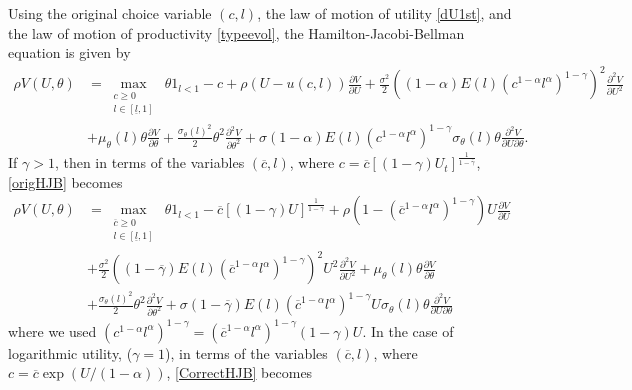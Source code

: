 \documentclass[11pt]{article}
\theoremstyle{plain}
\begin{document}
Using the original choice variable $(c,l)$, the law of motion of utility \eqref{dU1st}, and the law of motion of productivity \eqref{typeevol}, the Hamilton-Jacobi-Bellman equation is given by 
\begin{equation}
\begin{aligned}
\rho V(U,\theta) & = \max_{\substack{c \geq 0 \\ l \in [\underline{l}, 1]}} \ \theta 1_{l<1} - c + \rho{\left(U - u(c,l)\right)}\frac{\partial V}{\partial U} +
\frac{\sigma^2}{2}{\left((1-\alpha)E(l) {\left(c^{1-\alpha}l^\alpha\right)}^{1-\gamma}\right)}^2\frac{\partial^2V}{\partial U^2}
\\ &  + \mu_{\theta}(l) \theta\frac{\partial V}{\partial \theta} + \frac{\sigma_{\theta}(l)^2}{2}\theta^2\frac{\partial^2V}{\partial \theta^2}+ \sigma (1-\alpha)E(l) {\left(c^{1-\alpha}l^\alpha\right)}^{1-\gamma} \sigma_{\theta}(l)\theta \frac{\partial^2V}{\partial U\partial \theta}.
\label{origHJB}
\end{aligned}
\end{equation}
If $\gamma > 1$, then in terms of the variables $(\overline{c},l)$, where $c = \overline{c}[(1-\gamma)U_t]^{\frac{1}{1-\overline{\gamma}}}$, \eqref{origHJB} becomes
\begin{equation}
\begin{aligned}
\rho V(U,\theta) & = \max_{\substack{\overline{c} \geq 0 \\ l \in [\underline{l}, 1]}} \ \theta 1_{l<1} - \overline{c}[(1-\gamma)U]^{\frac{1}{1-\overline{\gamma}}} + \rho{\left(1 - {\left(\overline{c}^{1-\alpha}l^{\alpha}\right)}^{1-\gamma}\right)}U\frac{\partial V}{\partial U}
\\ & + \frac{\sigma^2}{2}{\left((1-\overline{\gamma})E(l) {\left(\overline{c}^{1-\alpha}l^\alpha\right)}^{1-\gamma}\right)}^2U^2\frac{\partial^2V}{\partial U^2}
 + \mu_{\theta}(l) \theta\frac{\partial V}{\partial \theta} 
 \\ & + \frac{\sigma_{\theta}(l)^2}{2}\theta^2\frac{\partial^2V}{\partial \theta^2} + \sigma (1-\overline{\gamma})E(l){\left(\overline{c}^{1-\alpha}l^{\alpha} \right)}^{1-\gamma}U \sigma_{\theta}(l)\theta \frac{\partial^2V}{\partial U\partial \theta}
\label{CorrectHJB}
\end{aligned}
\end{equation}
where we used $(c^{1-\alpha}l^{\alpha})^{1-\gamma} = (\overline{c}^{1-\alpha}l^{\alpha})^{1-\gamma}(1-\gamma)U$. In the case of logarithmic utility, ($\gamma=1$), in terms of the variables $(\overline{c},l)$, where $c = \overline{c}\exp(U/(1-\alpha))$, \eqref{CorrectHJB} becomes
\end{document}
